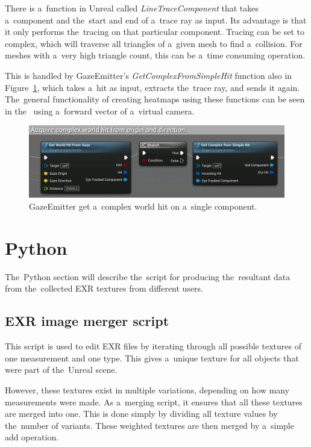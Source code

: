 There is a~function in Unreal called \emph{LineTraceComponent} that takes a~component and the~start and end of a~trace ray as input. Its advantage is that it only performs the~tracing on that particular component. Tracing can be set to complex, which will traverse all triangles of a~given mesh to find a~collision. For meshes with a~very high triangle count, this can be a~time consuming operation. 

This is handled by GazeEmitter's \emph{GetComplexFromSimpleHit} function also in Figure~\ref{fig:emitter-world-hit}, which takes a~hit as input, extracts the~trace ray, and sends it again. The~general functionality of creating heatmaps using these functions can be seen in the~ using a~forward vector of a~virtual camera.

\begin{figure}[!ht]
    \centering
    \includegraphics[width=\textwidth]{img/ray-world-hit.png}
    \caption{GazeEmitter get a~complex world hit on a~single component.}
    \label{fig:emitter-world-hit}
\end{figure}

\pagebreak{}

\section{Python}
\label{sec:python}
The~Python section will describe the~script for producing the~resultant data from the~collected EXR textures from different users.

\subsection{EXR image merger script}

This script is used to edit EXR files by iterating through all possible textures of one measurement and one type. This gives a~unique texture for all objects that were part of the~Unreal scene.

\medskip{}
However, these textures exist in multiple variations, depending on how many measurements were made. As a~merging script, it ensures that all these textures are merged into one. This is done simply by dividing all texture values by the~number of variants. These weighted textures are then merged by a~simple add operation.

